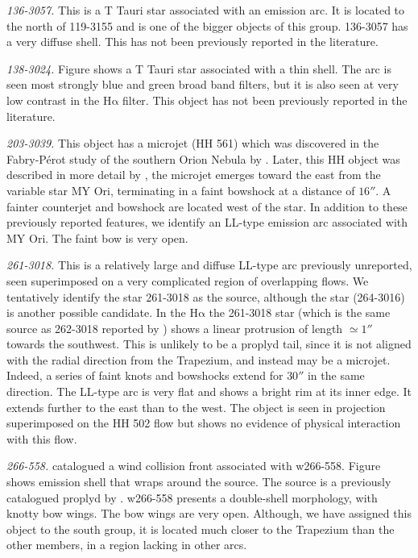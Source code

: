 \documentclass[apj, twocolumn]{aastex63}
\newcommand\ha{\ensuremath{\mathrm{H\alpha}}}
\begin{document}
\textit{136-3057.} This is a T Tauri star associated with an
emission arc. It is located to the north of 119-3155 and is
one of the bigger objects of this group. 136-3057 has a very
diffuse shell. This has not been previously reported in the
literature.

\textit{138-3024.} Figure shows a T Tauri star associated with a
thin shell. The arc is seen most strongly blue and green broad
band filters, but it is also seen at very low contrast in the \ha{}
filter. This object has not been previously reported in the
literature.

\textit{203-3039.} This object has a microjet (HH 561) which was
discovered in the Fabry-Pérot study of the southern Orion Nebula
by \citet{Bally:2001a}. Later, this HH object was described in
more detail by \citet{Bally:2006a}, the microjet emerges toward
the east from the variable star MY Ori, terminating in a faint
bowshock at a distance of \(16''\). A fainter counterjet and
bowshock are located west of the star. In addition to these
previously reported features, we identify an LL-type emission arc
associated with MY Ori. The faint bow is very open.

\textit{261-3018.} This is a relatively large and diffuse LL-type
arc previously unreported, seen superimposed on a very complicated
region of overlapping flows. We tentatively identify the star 261-3018
as the source, although the star (264-3016) is another possible
candidate. In the \ha{} the 261-3018 star (which is the same source
as 262-3018 reported by \citealp{Bally:2006a})  shows a linear protrusion
of length \(\simeq1''\) towards the southwest. This is unlikely to be
a proplyd tail, since it is not aligned with the radial direction from
the Trapezium, and instead may be a microjet. Indeed, a series of faint
knots and bowshocks extend for \(30''\) in the same direction.
The LL-type arc is very flat and shows a bright rim at its inner edge.
It extends further to the east than to the west. The object is seen
in projection superimposed on the HH 502 flow but shows no evidence
of physical interaction with this flow.

\textit{266-558.} \citet{Bally:2000a} catalogued a wind collision
front associated with w266-558. Figure shows emission shell that
wraps around the source. The source is a previously catalogued
proplyd by \citet{Ricci:2008a}. w266-558 presents a double-shell
morphology, with knotty bow wings. The bow wings are very open.
Although, we have assigned this object to the south group, it is
located much closer to the Trapezium than the other members, in
a region lacking in other arcs.
\end{document}
